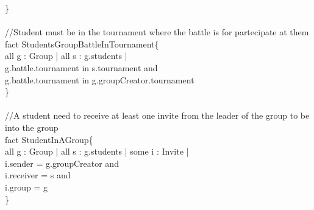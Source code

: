 \documentclass{article}
\begin{document}
{    \}\\
    \\
    \color{gray}
    //Student must be in the tournament where the battle is for partecipate at them\\
    \color{black}
    \color{blue} fact \color{black} StudentsGroupBattleInTournament\{\\
	    \-\hspace{1cm} \color{blue} all \color{black} g : Group | \color{blue} all \color{black} s : g.students | \\
        \-\hspace{1cm} g.battle.tournament \color{blue} in \color{black} s.tournament and \\
        \-\hspace{1cm} g.battle.tournament \color{blue} in \color{black} g.groupCreator.tournament\\
    \}\\
    \\
    \color{gray}
    //A student need to receive at least one invite from the leader of the group to be into the group\\
    \color{black}
    \color{blue} fact \color{black} StudentInAGroup\{\\
	    \-\hspace{1cm} \color{blue} all \color{black} g : Group | \color{blue} all \color{black} s : g.students | \color{blue} some \color{black} i : Invite |\\
	    \-\hspace{1cm} i.sender \color{blue} = \color{black} g.groupCreator and\\
	    \-\hspace{1cm} i.receiver \color{blue} = \color{black} s  and \\
	    \-\hspace{1cm} i.group \color{blue} = \color{black} g\\
    \}\\
}
\end{document}
